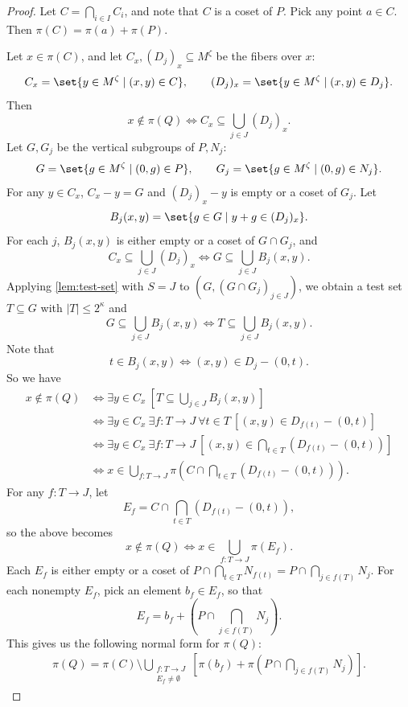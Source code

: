 \documentclass[11pt]{article}
\begin{document}
\begin{proof}
    Let $C = \bigcap_{i \in I} C_i$, and note that $C$ is a coset of $P$. 
    Pick any point $a \in C$. 
    Then $\pi(C) = \pi(a) + \pi(P)$.
    
    Let $x \in \pi(C)$, and let $C_x, (D_j)_x \subseteq M^\zeta$ be the fibers over $x$:
    \begin{align*}
        C_x  = \set{ y \in M^\zeta \mid (x,y) \in C }, \qquad
        (D_j)_x  = \set{ y \in M^\zeta \mid (x,y) \in D_j }.
    \end{align*}
    Then 
    \[
        x \not \in \pi(Q) \iff C_x \subseteq \bigcup_{j \in J} (D_j)_x.
    \]
    Let $G, G_j$ be the vertical subgroups of $P, N_j$:
    \begin{align*}
        G = \set{ g \in M^\zeta \mid (0,g) \in P }, \qquad
        G_j = \set{ g \in M^\zeta \mid (0,g) \in N_j }.
    \end{align*}
    For any $y \in C_x$, $C_x - y = G$ and $(D_j)_x - y$ is empty or a coset of $G_j$.
    Let 
    \[
        B_j(x,y) = \set{ g \in G \mid y + g \in (D_j)_x }.
    \]
    For each $j$, $B_j(x,y)$ is either empty or a coset of $G \cap G_j$, and
    \[
        C_x \subseteq \bigcup_{j \in J} (D_j)_x \iff G \subseteq \bigcup_{j \in J} B_j(x,y).
    \]
    Applying \cref{lem:test-set} with $S = J$ to $(G, (G \cap G_j)_{j \in J})$, we obtain a test set $T \subseteq G$ with $|T| \leq 2^\kappa$ and 
    \[ 
        G \subseteq \bigcup_{j \in J} B_j(x,y) \iff T \subseteq \bigcup_{j \in J} B_j(x,y). \]
    Note that 
    \[ 
        t \in B_j(x,y) \iff (x,y) \in D_j - (0,t).
    \]
    So we have
    \begin{align*}
        x \not \in \pi(Q) 
        & \iff \exists y \in C_x \ \left[ T \subseteq \bigcup_{j \in J} B_j(x,y) \right] \\
        & \iff \exists y \in C_x \ \exists f: T \to J \ \forall t \in T \ \left[ (x,y) \in D_{f(t)} - (0,t) \right] \\
        & \iff \exists y \in C_x \ \exists f: T \to J \ \left[ (x,y) \in \bigcap_{t \in T} (D_{f(t)} - (0,t)) \right] \\
        & \iff x \in \bigcup_{f: T \to J} \pi \! \left( C \cap \bigcap_{t \in T} (D_{f(t)} - (0,t)) \right).
    \end{align*}
    For any $f: T \to J$, let
    \[ E_f = C \cap \bigcap_{t \in T} (D_{f(t)} - (0,t)), \]
    so the above becomes
    \[
        x \not \in \pi(Q) \iff x \in \bigcup_{f: T \to J} \pi(E_f).
    \]
    Each $E_f$ is either empty or a coset of $P \cap \bigcap_{t \in T} N_{f(t)} = P \cap \bigcap_{j \in f(T)} N_j$.
    For each nonempty $E_f$, pick an element $b_f \in E_f$, so that 
    \[  
        E_f = b_f + \left( P \cap \bigcap_{j \in f(T)} N_j \right).
    \]
    This gives us the following normal form for $\pi(Q)$:
    \begin{align*}
        \pi(Q) = \pi(C) \setminus \bigcup_{\substack{f: T \to J \\ E_f \neq \emptyset}} \left[ \pi(b_f) + \pi\! \left( P \cap \bigcap_{j \in f(T)} N_j \right) \right].
    \end{align*}


\end{proof}
\end{document}
